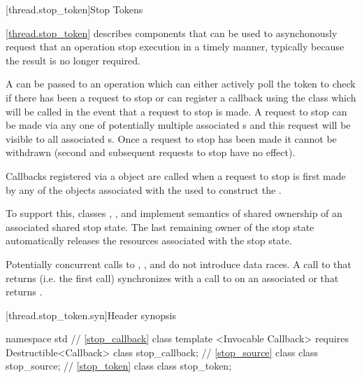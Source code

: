 {\color{insertcolor}

[thread.stop_token]{Stop Tokens}

\pnum
\ref{thread.stop_token} describes components that can be used to
asynchonously request that an operation stop execution in a timely
manner, typically because the result is no longer required.

\pnum
A  can be passed to an operation which can either
actively poll the token to check if there has been a request to stop
or can register a callback using the  class which
will be called in the event that a request to stop is made. A request
to stop can be made via any one of potentially multiple associated
s and this request will be visible to all associated
s. Once a request to stop has been made it cannot be
withdrawn (second and subsequent requests to stop have no effect).

\pnum
Callbacks registered via a  object are called when
a request to stop is first made by any of the  objects
associated with the  used to construct the .

\pnum
To support this, classes , , and 
implement semantics of shared ownership of an associated shared stop state.
The last remaining owner of the stop state automatically 
releases the resources associated with the stop state.

\pnum
Potentially concurrent calls to , ,
and 
do not introduce data races. 
A call to  that returns  (i.e. the first call)
synchronizes with a call to  on an associated 
or  that returns .

[thread.stop_token.syn]{Header  synopsis}
%

\begin{codeblock}
namespace std {
  // \ref{stop_callback} class 
  template <Invocable Callback>
    requires Destructible<Callback>
  class stop_callback;
  // \ref{stop_source} class 
  class stop_source;
  // \ref{stop_token} class 
  class stop_token;
}
\end{codeblock}


}
